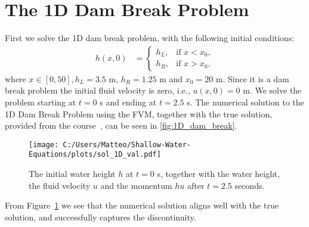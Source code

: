 \section{The 1D Dam Break Problem}
First we solve the 1D dam break problem, with the following initial conditions:
\begin{align*}
    h(x,0) &= \begin{cases}
        h_L, & \text{if } x < x_0, \\
        h_R, & \text{if } x > x_0,
    \end{cases} 
\end{align*}
where $x \in [0, 50], h_L = 3.5$ m, $h_R = 1.25$ m and $x_0 = 20$ m.
Since it is a dam break problem the initial fluid velocity is zero, i.e., $u(x,0) = 0$ m.
We solve the problem starting at $t=0$ s and ending at $t=2.5$ s.
The numerical solution to the 1D Dam Break Problem using the FVM, together with the true solution, provided from the course~\cite{phd_corse_2009}, can be seen in \autoref{fig:1D_dam_break}.
\begin{figure}[H]
    \centering
    \texttt{[image: C:/Users/Matteo/Shallow-Water-Equations/plots/sol\_1D\_val.pdf]}
    \caption{The initial water height $h$ at $t=0$ s, together with the water height, the fluid velocity $u$ and the momentum $hu$ after $t=2.5$ seconds.}\label{fig:1D_dam_break}
\end{figure}
From Figure~\ref{fig:1D_dam_break} we see that the numerical solution aligns well with the true solution, and successfully captures the discontinuity.



